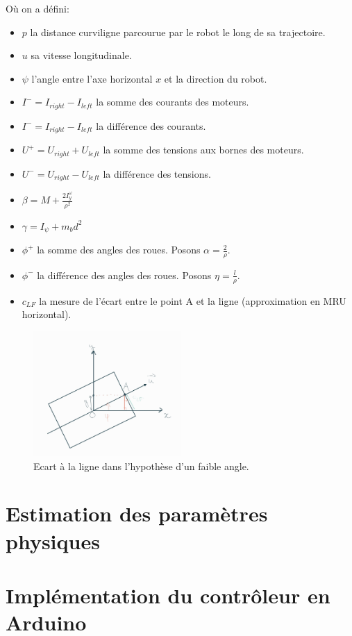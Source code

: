 \documentclass{report}
\begin{document}
Où on a défini:

\begin{itemize}
    \item $p$ la distance curviligne parcourue par le robot le long de sa trajectoire.
    \item $u$ sa vitesse longitudinale.
    \item $\psi$ l'angle entre l'axe horizontal $x$ et la direction du robot.
    \item $I^{-} = I_{right} - I_{left}$ la somme des courants des moteurs.
    \item $I^{-} = I_{right} - I_{left}$ la différence des courants.
    \item $U^{+} = U_{right} + U_{left}$ la somme des tensions aux bornes des moteurs.
    \item $U^{-} = U_{right} - U_{left}$ la différence des tensions.
    \item $\beta = M + \frac{2I^{\omega}_{y}}{\rho^2}$
    \item $\gamma = I_{\psi} + m_bd^2$
    \item $\phi^{+}$ la somme des angles des roues. Posons $\alpha = \frac{2}{\rho}$.
    \item $\phi^{-}$ la différence des angles des roues. Posons  $\eta = \frac{l}{\rho}$.
    \item $c_{LF}$ la mesure de l'écart entre le point A et la ligne (approximation en MRU horizontal).
\end{itemize}


\begin{figure}[h]  %
    \centering
    \includegraphics[width=0.5\textwidth]{figures/cLF_schema.jpg}
    \caption{Ecart à la ligne dans l'hypothèse d'un faible angle.}
  \end{figure}


\chapter{Estimation des paramètres physiques}

\chapter{Implémentation du contrôleur en Arduino}

\end{document}
